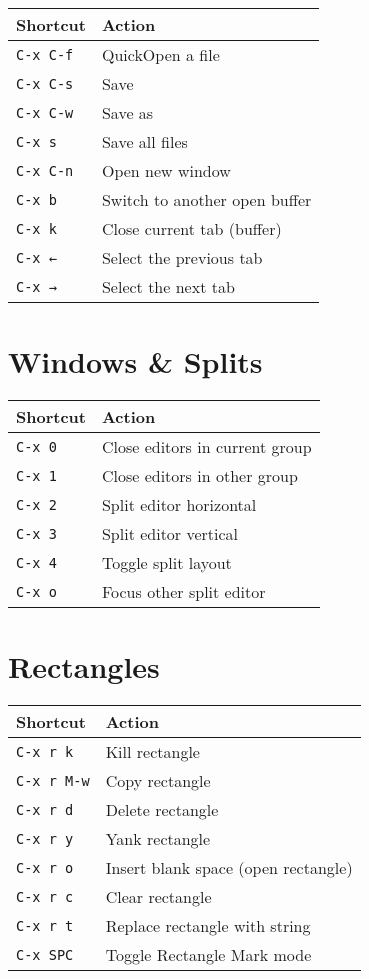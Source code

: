 \documentclass[10pt,landscape]{article}
\newcommand{\key}[1]{\textcolor{keycolor}{\texttt{#1}}}
\begin{document}
\begin{multicols}{2}
\begin{tabular}{@{}p{3cm}p{6.5cm}@{}}
\toprule
\textbf{Shortcut} & \textbf{Action} \\
\midrule
\key{C-x C-f} & QuickOpen a file \\
\key{C-x C-s} & Save \\
\key{C-x C-w} & Save as \\
\key{C-x s} & Save all files \\
\key{C-x C-n} & Open new window \\
\key{C-x b} & Switch to another open buffer \\
\key{C-x k} & Close current tab (buffer) \\
\key{C-x ←} & Select the previous tab \\
\key{C-x →} & Select the next tab \\
\bottomrule
\end{tabular}

\section*{\textcolor{sectioncolor}{Windows \& Splits}}

\begin{tabular}{@{}p{3cm}p{6.5cm}@{}}
\toprule
\textbf{Shortcut} & \textbf{Action} \\
\midrule
\key{C-x 0} & Close editors in current group \\
\key{C-x 1} & Close editors in other group \\
\key{C-x 2} & Split editor horizontal \\
\key{C-x 3} & Split editor vertical \\
\key{C-x 4} & Toggle split layout \\
\key{C-x o} & Focus other split editor \\
\bottomrule
\end{tabular}

\section*{\textcolor{sectioncolor}{Rectangles}}

\begin{tabular}{@{}p{3cm}p{6.5cm}@{}}
\toprule
\textbf{Shortcut} & \textbf{Action} \\
\midrule
\key{C-x r k} & Kill rectangle \\
\key{C-x r M-w} & Copy rectangle \\
\key{C-x r d} & Delete rectangle \\
\key{C-x r y} & Yank rectangle \\
\key{C-x r o} & Insert blank space (open rectangle) \\
\key{C-x r c} & Clear rectangle \\
\key{C-x r t} & Replace rectangle with string \\
\key{C-x SPC} & Toggle Rectangle Mark mode \\
\bottomrule
\end{tabular}


\end{multicols}
\end{document}
